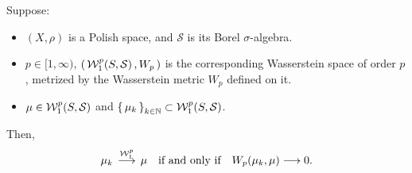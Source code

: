 \begin{theorem}
\label{theorem:WassersteinMetricMetrizesWassersteinConvergence}
\noindent
Suppose:
\begin{itemize}
\item $(X, \rho)$ is a Polish space, and $\mathcal{S}$ is its Borel $\sigma$-algebra.
\item $p \in [1,\infty)$,
	$\left(\,\mathcal{W}^{p}_{1}\!\left(S,\mathcal{S}\right),W_{p}\,\right)$ is the corresponding Wasserstein space of order $p$,
	metrized by the Wasserstein metric $W_{p}$ defined on it.
\item $\mu \in \mathcal{W}^{p}_{1}\!\left(S,\mathcal{S}\right)$ and
	$\left\{\,\mu_{k}\,\right\}_{k\in\mathbb{N}} \subset \mathcal{W}^{p}_{1}\!\left(S,\mathcal{S}\right)$.
\end{itemize}
Then,
\begin{equation*}
\mu_{k} \, \overset{\mathcal{W}^{p}_{1}}{\longrightarrow} \, \mu
\quad\textnormal{if and only if}\quad
W_{p}\!\left(\mu_{k},\mu\right) \longrightarrow 0.
\end{equation*}
\end{theorem}

